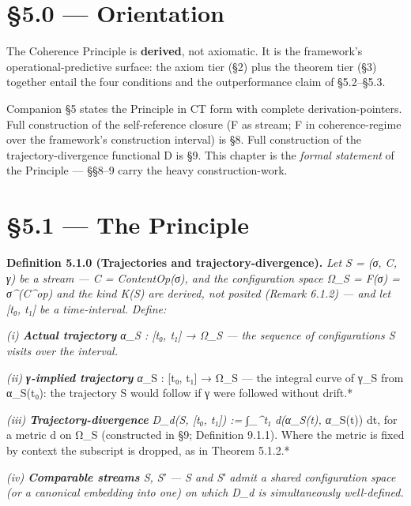 \documentclass[11pt, openany]{book}
\newcommand{\sectionbreak}{\clearpage}
\begin{document}
\sectionbreak

\section{§5.0 --- Orientation}

The Coherence Principle is \textbf{derived}, not axiomatic. It is the framework's operational-predictive surface: the axiom tier (§2) plus the theorem tier (§3) together entail the four conditions and the outperformance claim of §5.2–§5.3.

Companion §5 states the Principle in CT form with complete derivation-pointers. Full construction of the self-reference closure (F as stream; F in coherence-regime over the framework's construction interval) is §8. Full construction of the trajectory-divergence functional D is §9. This chapter is the \textit{formal statement} of the Principle --- §§8–9 carry the heavy construction-work.

\sectionbreak

\section{§5.1 --- The Principle}

\textbf{Definition 5.1.0 (Trajectories and trajectory-divergence).} \textit{Let S = (σ, C, γ) be a stream --- C = ContentOp(σ), and the configuration space Ω\_\allowbreak{}S = F(σ) = σ\textasciicircum{}(C\textasciicircum{}op) and the kind K(S) are derived, not posited (Remark 6.1.2) --- and let [t₀, t₁] be a time-interval. Define:}

\textit{(i) \textbf{Actual trajectory} α\_\allowbreak{}S : [t₀, t₁] → Ω\_\allowbreak{}S --- the sequence of configurations S visits over the interval.}

\textit{(ii) \textbf{γ-implied trajectory} α}\_\allowbreak{}S : [t₀, t₁] → Ω\_\allowbreak{}S --- the integral curve of γ\_\allowbreak{}S from α\_\allowbreak{}S(t₀): the trajectory S would follow if γ were followed without drift.*

\textit{(iii) \textbf{Trajectory-divergence} D\_\allowbreak{}d(S, [t₀, t₁]) := ∫\_\textasciicircum{}{t₁} d(α\_\allowbreak{}S(t), α}\_\allowbreak{}S(t)) dt, for a metric d on Ω\_\allowbreak{}S (constructed in §9; Definition 9.1.1). Where the metric is fixed by context the subscript is dropped, as in Theorem 5.1.2.*

\textit{(iv) \textbf{Comparable streams} S, S′ --- S and S′ admit a shared configuration space (or a canonical embedding into one) on which D\_\allowbreak{}d is simultaneously well-defined.}
\end{document}
